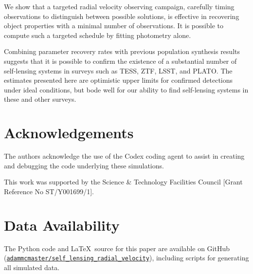 \documentclass[fleqn,usenatbib]{mnras}
\begin{document}
We show that a targeted radial velocity observing campaign, carefully timing observations to distinguish between possible solutions, is effective in recovering object properties with a minimal number of observations. It is possible to compute such a targeted schedule by fitting photometry alone.

Combining parameter recovery rates with previous population synthesis results suggests that it is possible to confirm the existence of a substantial number of self-lensing systems in surveys such as TESS, ZTF, LSST, and PLATO. The estimates presented here are optimistic upper limits for confirmed detections under ideal conditions, but bode well for our ability to find self-lensing systems in these and other surveys.

\section*{Acknowledgements}
The authors acknowledge the use of the Codex coding agent to assist in creating and debugging the code underlying these simulations.

This work was supported by the Science \& Technology Facilities Council [Grant Reference No ST/Y001699/1].

\section*{Data Availability}

The Python code and \LaTeX~source for this paper are available on GitHub (\href{https://github.com/adammcmaster/self_lensing_radial_velocity}{\texttt{adammcmaster/self\_lensing\_radial\_velocity}}), including scripts for generating all simulated data.







\end{document}
